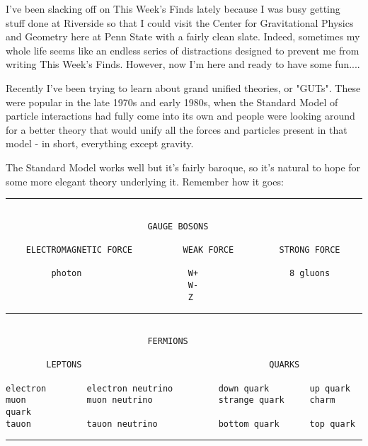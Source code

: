 

I've been slacking off on This Week's Finds lately because I was
busy getting stuff done at Riverside so that I could visit the 
Center for Gravitational Physics and Geometry here at Penn State
with a fairly clean slate.  Indeed, sometimes my whole life seems
like an endless series of distractions designed to prevent me from
writing This Week's Finds.  However, now I'm here and ready to have
some fun....

Recently I've been trying to learn about grand unified theories, or
"GUTs".  These were popular in the late 1970s and early 1980s, when
the Standard Model of particle interactions had fully come into its
own and people were looking around for a better theory that would
unify all the forces and particles present in that model - in short,
everything except gravity.  

The Standard Model works well but it's fairly baroque, so it's natural
to hope for some more elegant theory underlying it.  Remember how it
goes: 

\par\noindent\rule{\textwidth}{0.4pt}

\begin{verbatim}

                            GAUGE BOSONS
                           
    ELECTROMAGNETIC FORCE          WEAK FORCE         STRONG FORCE
        
         photon                     W+                  8 gluons 
                                    W-
                                    Z  
\end{verbatim}
    
\par\noindent\rule{\textwidth}{0.4pt}

\begin{verbatim}

                            FERMIONS

        LEPTONS                                     QUARKS

electron        electron neutrino         down quark        up quark
muon            muon neutrino             strange quark     charm quark
tauon           tauon neutrino            bottom quark      top quark
\end{verbatim}
    
\par\noindent\rule{\textwidth}{0.4pt}

